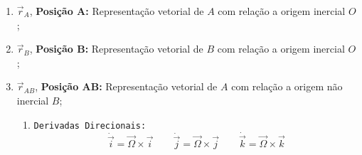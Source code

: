 \documentclass{article}
\begin{document}
                \begin{enumerate}[rightmargin = \leftmargin, noitemsep]
                    \item $\vec{r}_{A}$, \textbf{Posição A:} Representação vetorial de $A$ com relação a origem inercial $O$;

                    \item $\vec{r}_{B}$, \textbf{Posição B:} Representação vetorial de $B$ com relação a origem inercial $O$;

                    \item $\vec{r}_{AB}$, \textbf{Posição AB:} Representação vetorial de $A$ com relação a origem não inercial $B$;
                        \begin{enumerate}[rightmargin = \leftmargin]
                            \item \texttt{Derivadas Direcionais:}
                                \begin{equation}
                                    \boxed{
                                        \dot{\vec{i}} = 
                                        \vec{\Omega}\times\vec{i}
                                    }
                                    \qquad
                                    \boxed{
                                        \dot{\vec{j}} = 
                                        \vec{\Omega}\times\vec{j}
                                    }
                                    \qquad
                                    \boxed{
                                        \dot{\vec{k}} = 
                                        \vec{\Omega}\times\vec{k}
                                    }
                                \end{equation}\noindent
                        \end{enumerate}


\end{enumerate}
\end{document}
